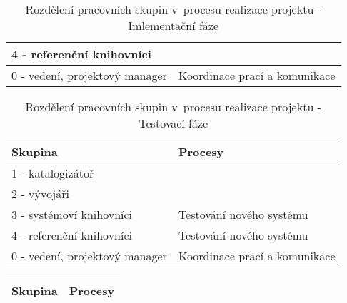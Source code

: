 \documentclass[
	11pt, oneside, printed, draft, 
	table,   %
	lof,     %
	lot     %
]{fithesis3}
\newcommand{\bold}[1]{\textbf{#1}}
\begin{document}
{\begin{table}[c]
\begin{tabular}{| p{3cm} | p{8.3cm} |}
	4 - referenční knihovníci
    & 
    
    \\ \hline
    
	0 - vedení, projektový manager
    & 
    Koordinace prací a komunikace
    \\ \hline
    
    \end{tabular}
    \caption{Rozdělení pracovních skupin v~procesu realizace projektu - Imlementační fáze}
\end{table}

\begin{table}
    \centering
    \begin{tabular}{| p{3cm} | p{8.3cm} |}
    \hline
    \bold{Skupina} 	
    & 
    \bold{Procesy} 
    \\ \hline
    
	1 - katalogizátoř
    & 

    \\ \hline
    
	2 - vývojáři
    & 

    \\ \hline
    
	3 - systémoví knihovníci
    & 
    Testování nového systému
    \\ \hline
    
	4 - referenční knihovníci
    & 
    Testování nového systému
    \\ \hline
    
	0 - vedení, projektový manager
    & 
    Koordinace prací a komunikace
    \\ \hline
    
    \end{tabular}
    \caption{Rozdělení pracovních skupin v~procesu realizace projektu - Testovací fáze}
\end{table}

\begin{table}
    \centering
    \begin{tabular}{| p{3cm} | p{8.3cm} |}
    \hline
    \bold{Skupina} 	
    & 
    \bold{Procesy} 
    \\ \hline
    

\end{tabular}
\end{table}}
\end{document}
